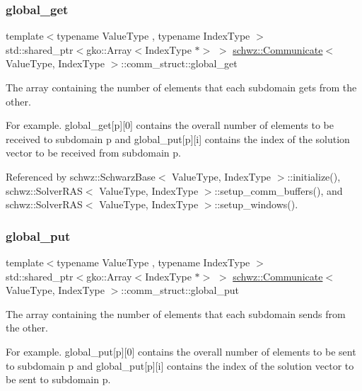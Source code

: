 \subsubsection{\texorpdfstring{global\+\_\+get}{global\_get}}
{\footnotesize\ttfamily template$<$typename Value\+Type , typename Index\+Type $>$ \\
std\+::shared\+\_\+ptr$<$gko\+::\+Array$<$Index\+Type $\ast$$>$ $>$ \hyperlink{classschwz_1_1Communicate}{schwz\+::\+Communicate}$<$ Value\+Type, Index\+Type $>$\+::comm\+\_\+struct\+::global\+\_\+get}



The array containing the number of elements that each subdomain gets from the other. 

For example. global\+\_\+get\mbox{[}p\mbox{]}\mbox{[}0\mbox{]} contains the overall number of elements to be received to subdomain p and global\+\_\+put\mbox{[}p\mbox{]}\mbox{[}i\mbox{]} contains the index of the solution vector to be received from subdomain p. 

Referenced by schwz\+::\+Schwarz\+Base$<$ Value\+Type, Index\+Type $>$\+::initialize(), schwz\+::\+Solver\+R\+A\+S$<$ Value\+Type, Index\+Type $>$\+::setup\+\_\+comm\+\_\+buffers(), and schwz\+::\+Solver\+R\+A\+S$<$ Value\+Type, Index\+Type $>$\+::setup\+\_\+windows().

\mbox{\label{structschwz_1_1Communicate_1_1comm__struct_a2fb26c3f0a44cf875080a8d36b082150}} 
\subsubsection{\texorpdfstring{global\+\_\+put}{global\_put}}
{\footnotesize\ttfamily template$<$typename Value\+Type , typename Index\+Type $>$ \\
std\+::shared\+\_\+ptr$<$gko\+::\+Array$<$Index\+Type $\ast$$>$ $>$ \hyperlink{classschwz_1_1Communicate}{schwz\+::\+Communicate}$<$ Value\+Type, Index\+Type $>$\+::comm\+\_\+struct\+::global\+\_\+put}



The array containing the number of elements that each subdomain sends from the other. 

For example. global\+\_\+put\mbox{[}p\mbox{]}\mbox{[}0\mbox{]} contains the overall number of elements to be sent to subdomain p and global\+\_\+put\mbox{[}p\mbox{]}\mbox{[}i\mbox{]} contains the index of the solution vector to be sent to subdomain p. 

